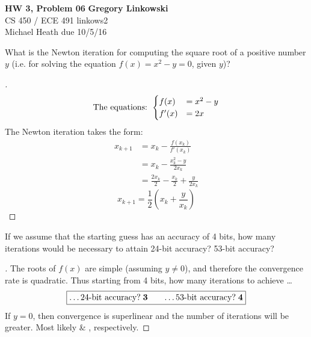 \documentclass[12pt]{article}
\newenvironment{exercise}[2][Exercise]{\begin{trivlist}
\item[\hskip \labelsep {\bfseries #1}\hskip \labelsep {\bfseries #2.}]}{\end{trivlist}}
\begin{document}
\noindent
\large\textbf{HW 3, Problem 06} \hfill \textbf{Gregory Linkowski} \\
\normalsize CS 450 / ECE 491 \hfill linkows2 \\
Michael Heath \hfill due 10/5/16 \\



\begin{exercise}{1}
	What is the Newton iteration for computing the square root of a positive number $y$ (i.e. for solving the equation $f(x)=x^2 -  y=0$, given $y$)?
\end{exercise}
\begin{proof}[]
	\[ \textnormal{The equations:  }
	\begin{cases}
		f(x) &= x^2 - y \\
		f'(x) &= 2x
	\end{cases} \]
	The Newton iteration takes the form:
	\begin{align*}
		x_{k+1} &= x_k - \frac{f(x_k)}{f'(x_k)} \\
		&= x_k - \frac{x_k^2 - y}{2 x_k} \\
		&= \frac{2x_k}{2} - \frac{x_k}{2} + \frac{y}{2x_k}
	\end{align*}
	\[ \boxed{x_{k+1} = \frac{1}{2}\left( x_k + \frac{y}{x_k} \right)} \]
\end{proof}

\begin{exercise}{2}
	If we assume that the starting guess has an accuracy of 4 bits, how many iterations would be necessary to attain 24-bit accuracy? 53-bit accuracy?
\end{exercise}
\begin{proof}[]
	The roots of $f(x)$ are simple (assuming $y \neq 0$), and therefore the convergence rate is quadratic. Thus starting from 4 bits, how many iterations to achieve \dots \\
	\[\boxed{ \textnormal{\dots 24-bit accuracy?} \; \bm{3} \qquad
			\textnormal{\hfill \dots 53-bit accuracy?} \; \bm{4} } \]
	If $y = 0$, then convergence is superlinear and the number of iterations will be greater. Most likely  \& , respectively.
\end{proof}
\end{document}
